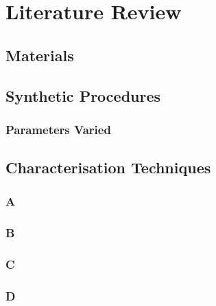 \chapter{Literature Review}
\section{Materials}

\section{Synthetic Procedures}
\subsection{Parameters Varied}

\section{Characterisation Techniques}
\subsection{A}
\subsection{B}
\subsection{C}
\subsection{D}